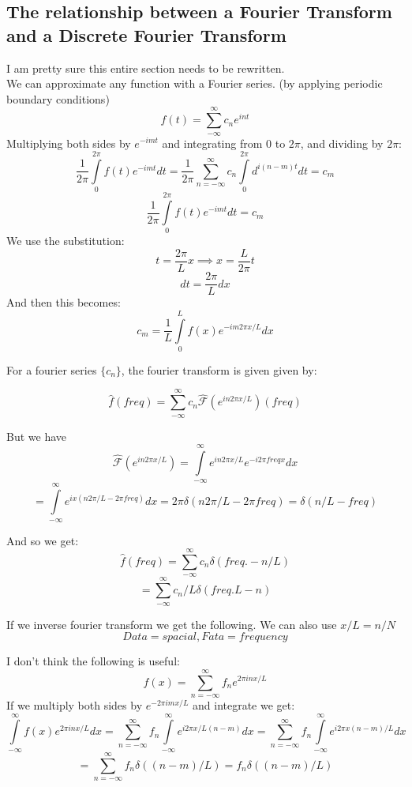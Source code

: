 \documentclass[a4paper,12pt]{report}
\begin{document}
\subsection{The relationship between a Fourier Transform and a Discrete Fourier Transform}
I am pretty sure this entire section needs to be rewritten.\\
We can approximate any function with a Fourier series. (by applying periodic boundary conditions)\\
$$f(t)=\sum\limits_{-\infty}^{\infty} c_n e^{i n t}$$
Multiplying both sides by $e^{-i m t}$ and integrating from 0 to $2\pi$, and dividing by $2\pi$:
$$\frac{1}{2\pi} \int\limits_{0}^{2\pi} f(t)e^{-i m t}dt = \frac{1}{2\pi} \sum \limits_{n=-\infty}^{\infty} c_n \int\limits_{0}^{2\pi} d^{i (n-m) t} dt= c_m$$
$$\frac{1}{2\pi} \int\limits_{0}^{2\pi} f(t)e^{-i m t}dt =c_m$$
We use the substitution:
$$t = \frac{2\pi}{L}  x \implies x = \frac{L}{2\pi} t$$
$$dt = \frac{2\pi}{L}  dx$$
And then this becomes:
$$c_m = \frac{1}{L} \int\limits_{0}^{L} f(x) e^{-i m 2\pi x/L} dx $$

For a fourier series $\{c_n\}$, the fourier transform is given given by:

$$\hat f (freq) = \sum\limits_{-\infty}^{\infty} c_n \mathscr{\hat F}(e^{i n 2 \pi x/L})(freq)$$ 

But we have $$\mathscr{\hat F}(e^{i n 2 \pi x/L}) = \int\limits_{-\infty}^\infty e^{i n 2 \pi x/L}e^{-i 2\pi freq x} dx $$
$$= \int\limits_{-\infty}^\infty e^{i x (n 2 \pi /L - 2\pi freq )}dx = 2\pi \delta (n 2\pi/L -2\pi freq)= \delta (n /L - freq)$$

And so we get:
$$\hat f (freq) = \sum\limits_{-\infty}^{\infty} c_n \delta(freq.- n/L)$$
$$= \sum\limits_{-\infty}^{\infty} c_n /L \delta(freq. L- n)$$

If we inverse fourier transform we get the following.
We can also use $x/L=n/N$
$$Data = spacial,  Fata=frequency$$


I don’t think the following is useful:
$$f(x)= \sum\limits_{n=-\infty}^\infty f_n e^{2\pi i n x/L} $$
If we multiply both sides by $e^{-2\pi i m x/L}$ and integrate we get:
$$\int \limits_{-\infty}^\infty f(x)e^{2\pi i n x/L} dx = \sum\limits_{n=-\infty}^\infty  f_n  \int \limits_{-\infty}^\infty  e^{i 2 \pi x/L (n-m)} dx  =  \sum\limits_{n=-\infty}^\infty  f_n  \int \limits_{-\infty}^\infty  e^{i 2 \pi x (n-m)/L} dx  $$
$$=  \sum\limits_{n=-\infty}^\infty  f_n \delta((n-m)/L) = f_n \delta((n-m)/L)$$

\fi
\end{document}
